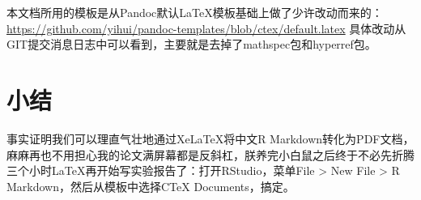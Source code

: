 \documentclass[hyperref,]{ctexart}
\begin{document}
本文档所用的模板是从Pandoc默认LaTeX模板基础上做了少许改动而来的：\url{https://github.com/yihui/pandoc-templates/blob/ctex/default.latex}
具体改动从GIT提交消息日志中可以看到，主要就是去掉了mathspec包和hyperref包。

\hypertarget{ux5c0fux7ed3}{%
\section{小结}\label{ux5c0fux7ed3}}

事实证明我们可以理直气壮地通过XeLaTeX将中文R
Markdown转化为PDF文档，麻麻再也不用担心我的论文满屏幕都是反斜杠，朕养完小白鼠之后终于不必先折腾三个小时LaTeX再开始写实验报告了：打开RStudio，菜单File
\textgreater{} New File \textgreater{} R Markdown，然后从模板中选择CTeX
Documents，搞定。
\end{document}
